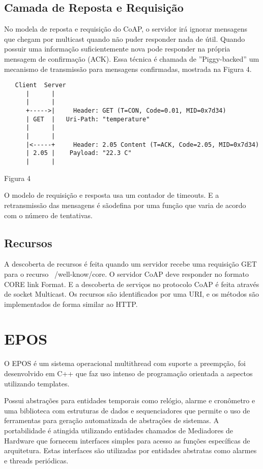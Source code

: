 \subsection{Camada de Reposta e Requisi\c{c}\~ao}
No modela de reposta e requisi\c{c}\~ao do CoAP, o servidor ir\'a ignorar mensagens que chegam por multicast quando n\~ao puder responder nada de \'util. Quando possuir uma informa\c{c}\~ao suficientemente nova pode responder na pr\'opria mensagem de confirma\c{c}\~ao (ACK). Essa t\'ecnica \'e chamada de ''Piggy-backed'' um mecanismo de transmiss\~ao para mensagens confirmadas, mostrada na Figura 4.\cite{draft-ietf-core-coap-18}

\begin{verbatim}
   Client  Server
      |      |
      |      |
      +----->|     Header: GET (T=CON, Code=0.01, MID=0x7d34)
      | GET  |   Uri-Path: "temperature"
      |      |
      |      |
      |<-----+     Header: 2.05 Content (T=ACK, Code=2.05, MID=0x7d34)
      | 2.05 |    Payload: "22.3 C"
      |      |
\end{verbatim}
Figura 4

O modelo de requisi\c{c}\~ao e resposta usa um contador de timeouts. E a retransmiss\~ao das mensagens \'e s\~aodefina por uma fun\c{c}\~ao que varia de acordo com o n\'umero de tentativas.
 

\subsection{Recursos}
A descoberta de recursos \'e feita quando um servidor recebe uma requisi\c{c}\~ao GET para o recurso ~/well-know/core. O servidor CoAP deve responder no formato CORE link Format.\cite{rfc6690} E a descoberta de servi\c{c}os no protocolo CoAP \'e feita atrav\'es de socket Multicast. Os recursos s\~ao identificados por uma URI, e os m\'etodos s\~ao implementados de forma similar ao HTTP.


\section{EPOS}
O EPOS \'e um sistema operacional multithread com suporte a preemp\c{c}\~ao, foi desenvolvido em C++ que faz uso intenso de programa\c{c}\~ao orientada a aspectos utilizando templates.

Possui abstra\c{c}\~oes para entidades temporais como rel\'ogio, alarme e cron\^ometro e uma biblioteca com estruturas de dados e sequenciadores que permite o uso de ferramentas para gera\c{c}\~ao automatizada de abstra\c{c}\~oes de sistemas. A portabilidade \'e atingida utilizando entidades chamados de Mediadores de Hardware que fornecem interfaces simples para acesso as fun\c{c}\~oes espec\'ificas de arquitetura. Estas interfaces s\~ao utilizadas por entidades abstratas como alarmes e threads peri\'odicas.

